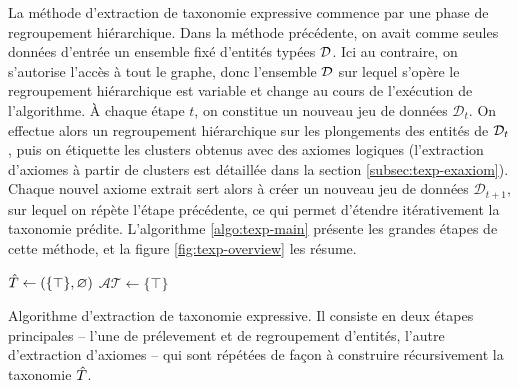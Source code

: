 La méthode d'extraction de taxonomie expressive commence par une phase de regroupement hiérarchique. Dans la méthode précédente, on avait comme seules données d'entrée un ensemble fixé d'entités typées $\cal{D}$. Ici au contraire, on s'autorise l'accès à tout le graphe, donc l'ensemble $\cal{D}$ sur lequel s'opère le regroupement hiérarchique est variable et change au cours de l'exécution de l'algorithme. À chaque étape $t$, on constitue un nouveau jeu de données $\mathcal{D}_t$.
On effectue alors un regroupement hiérarchique sur les plongements des entités de $\cal{D}_t$, puis on étiquette les clusters obtenus avec des axiomes logiques (l'extraction d'axiomes à partir de clusters est détaillée dans la section \ref{subsec:texp-exaxiom}). Chaque nouvel axiome extrait sert alors à créer un nouveau jeu de données $\mathcal{D}_{t+1}$, sur lequel on répète l'étape précédente, ce qui permet d'étendre itérativement la taxonomie prédite. L'algorithme \ref{algo:texp-main} présente les grandes étapes de cette méthode, et la figure \ref{fig:texp-overview} les résume.



\begin{algorithm}

$\Tpred \leftarrow  (\{ \top \}, \varnothing)$ \;
$\mathcal{AT} \leftarrow \{ \top \}$\;

\caption{Algorithme d'extraction de taxonomie expressive. Il consiste en deux étapes principales – l'une de prélevement et de regroupement d'entités, l'autre d'extraction d'axiomes – qui sont répétées de façon à construire récursivement la taxonomie $\Tpred$.}
\label{algo:texp-main}
\end{algorithm}



